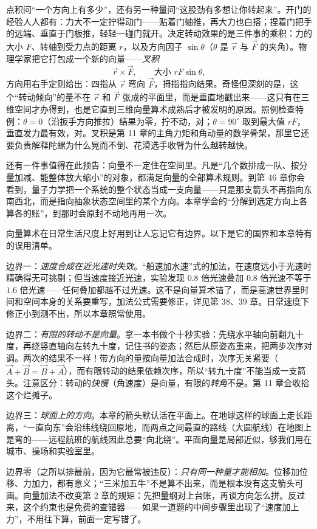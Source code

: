 \begin{challenge}
点积问“一个方向上有多少”，还有另一种量问“这股劲有多想让你转起来”。开门的经验人人都有：力大不一定拧得动门——贴着门轴推，再大力也白搭；捏着门把手的远端、垂直于门板推，轻轻一碰门就开。决定转动效果的是三件事的乘积：力的大小 \(F\)、转轴到受力点的距离 \(r\)，以及方向因子 \(\sin\theta\)（\(\theta\) 是 \(\vec r\) 与 \(\vec F\) 的夹角）。物理学家把它打包成一个新的向量——\emph{叉积}
\[
  \vec{r}\times\vec{F},\qquad \text{大小 } rF\sin\theta ,
\]
方向用右手定则给出：四指从 \(\vec r\) 弯向 \(\vec F\)，拇指指向结果。奇怪但深刻的是，这个“转动倾向”的量不在 \(\vec r\) 和 \(\vec F\) 张成的平面里，而是垂直地戳出来——这只有在三维空间才办得到，也是它直到三维向量算术成熟后才被发明的原因。照例检查特例：\(\theta=0\)（沿扳手方向推拉）结果为零，拧不动，对；\(\theta=90^{\circ}\) 取到最大值 \(rF\)，垂直发力最有效，对。叉积是第 11 章的主角力矩和角动量的数学骨架，那里它还要负责解释陀螺为什么晃而不倒、花滑选手收臂为什么越转越快。

还有一件事值得在此预告：向量不一定住在空间里。凡是“几个数排成一队、按分量加减、能整体放大缩小”的对象，都满足向量的全部算术规则。到第 46 章你会看到，量子力学把一个系统的整个状态当成一支向量——只是那支箭头不再指向东南西北，而是指向抽象状态空间里的某个方向。本章学会的“分解到选定方向上各算各的账”，到那时会原封不动地再用一次。
\end{challenge}


\begin{mainline}
向量算术在日常生活尺度上好用到让人忘记它有边界。以下是它的国界和本章特有的误用清单。

边界一：\emph{速度合成在近光速时失效}。“船速加水速”式的加法，在速度远小于光速时精确得无可挑剔；但当速度接近光速，实验发现 \(0.8\) 倍光速叠加 \(0.8\) 倍光速不等于 \(1.6\) 倍光速——任何叠加都越不过光速。这不是向量算术错了，而是高速世界里时间和空间本身的关系要重写，加法公式需要修正，详见第 38、39 章。日常速度下修正小到测不出，所以本章照常使用。

边界二：\emph{有限的转动不是向量}。拿一本书做个十秒实验：先绕水平轴向前翻九十度，再绕竖直轴向左转九十度，记住书的姿态；然后从原姿态重来，把两步次序对调。两次的结果不一样！带方向的量按向量加法合成时，次序无关紧要（\(\vec A+\vec B=\vec B+\vec A\)），而有限转动的结果依赖次序，所以“转九十度”不能当成一支箭头。注意区分：转动的\emph{快慢}（角速度）是向量，有限的\emph{转角}不是。第 11 章会收拾这个烂摊子。

边界三：\emph{球面上的方向}。本章的箭头默认活在平面上。在地球这样的球面上走长距离，“一直向东”会沿纬线绕回原地，而两点之间最直的路线（大圆航线）在地图上是弯的——远程航班的航线因此总要“向北绕”。平面向量是局部近似，够我们用在城市、操场和实验室里。

边界零（之所以排最前，因为它最常被违反）：\emph{只有同一种量才能相加}。位移加位移、力加力，都有意义；“三米加五牛”不是算不出来，而是根本没有这支箭头可画。向量加法不改变第 2 章的规矩：先把量纲对上台账，再谈方向怎么拼。反过来，这个约束也是免费的查错器——如果一道题的中间步骤里出现了“速度加上力”，不用往下算，前面一定写错了。
\end{mainline}

